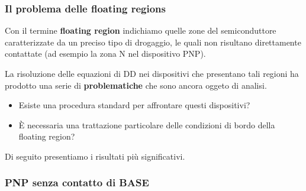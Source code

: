 
\begin{frame}
\frametitle{Il problema delle floating regions}
Con il termine \textbf{floating region} indichiamo quelle zone del semiconduttore caratterizzate da un preciso tipo di drogaggio, le quali non risultano direttamente contattate (ad esempio la zona N nel dispositivo PNP).

\vspace{0.5cm}

La risoluzione delle equazioni di DD nei dispositivi che presentano tali regioni ha prodotto una serie di \textbf{problematiche} che sono ancora oggeto di analisi.

\vspace{0.5cm}

\begin{itemize}
\item Esiste una procedura standard per affrontare questi dispositivi?
\item \`E necessaria una trattazione particolare delle condizioni di bordo della floating region?
\end{itemize}

\vspace{0.5cm}

Di seguito presentiamo i risultati pi\`u significativi.

\end{frame}

\begin{frame}
\frametitle{PNP senza contatto di BASE}
\begin{center}
\begin{figure}
\vspace{-0.5cm}
\end{figure}
\begin{figure}
\end{figure}
\end{center}
\end{frame}

